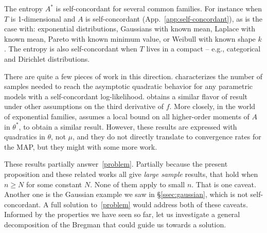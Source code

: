 \documentclass[twoside]{article}
\newcommand{\logpart}{A}
\newcommand{\conj}{\logpart^*}
\newcommand{\nat}{\theta}
\newcommand{\m}{\mu}
\begin{document}
The entropy $\conj$ is self-concordant for several common families.
For instance when $T$ is 1-dimensional and $\logpart$ is self-concordant (App.~\ref{app:self-concordant}),
as is the case with:
exponential distributions,
Gaussians with known mean,
Laplace with known mean,
Pareto with known minimum value,
or Weibull with known shape $k$.
The entropy is also self-concordant when $T$ lives in a compact \citep{bubeck2015entropic} -- e.g., categorical and Dirichlet distributions.

There are quite a few pieces of work in this direction.
\citet{ostrovskii2021finite} characterizes the number of samples needed to reach the asymptotic quadratic behavior for any parametric models with a self-concordant log-likelihood.
\citet{anastasiou2017bounds} obtains a similar flavor of result under other assumptions on the third derivative of $f$.
More closely, in the world of exponential families, \citet{kakade2010learning} assumes a local bound on all higher-order moments of $\logpart$ in $\nat^*$, to obtain a similar result.
However, these results are expressed with quadratics in $\nat$, not $\m$, and they do not directly translate to convergence rates for the MAP, but they might with some more work.

These results partially answer~\eqref{problem}.
Partially because the present proposition and these related works all give \textit{large sample} results,  that hold when $n\geq N$ for some constant $N$.
None of them apply to small $n$.
That is one caveat. Another one is the Gaussian example we saw in \S\ref{ssec:gaussian}, which is not self-concordant.
A full solution to~\eqref{problem} would address both of these caveats.
Informed by the properties we have seen so far, let us investigate a general decomposition of the Bregman that could guide us towards a solution.
\end{document}
